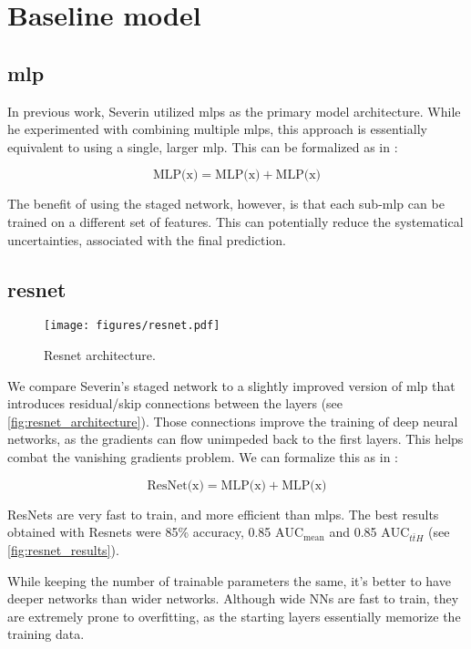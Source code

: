 \section{Baseline model}

\subsection[MLP]{\gls{mlp}}

In previous work, Severin utilized \glspl{mlp} as the primary model architecture.
While he experimented with combining multiple \glspl{mlp}, this approach is essentially equivalent to using a single,
larger \gls{mlp}. This can be formalized as in \cite{ft-transformer}:

$$
    \text{MLP(x)} = \text{MLP(x)} + \text{MLP(x)}
$$

The benefit of using the staged network, however, is that each sub-\gls{mlp} can be trained on a different set of
features. This can potentially reduce the systematical uncertainties, associated with the final prediction.



\subsection[resnet]{\gls{resnet}}

\begin{figure}[htbp]
    \centering
    \texttt{[image: figures/resnet.pdf]}
    \caption{Resnet architecture.}
    \label{fig:resnet_architecture}
\end{figure}

We compare Severin's staged network to a slightly improved version of \gls{mlp} that introduces residual/skip
connections between the layers (see \autoref{fig:resnet_architecture}).
Those connections improve the training of deep neural networks, as the gradients can flow unimpeded back to the first
layers. This helps combat the vanishing gradients problem. We can formalize this as in
\cite{ft-transformer}:

$$
    \text{ResNet(x)} = \text{MLP(x)} + \text{MLP(x)}
$$

ResNets are very fast to train, and more efficient than mlps. The best results obtained with Resnets were 85\% accuracy,
0.85 $\text{AUC}_\text{mean}$ and 0.85 $\text{AUC}_{t\bar{t}H}$ (see \autoref{fig:resnet_results}).

While keeping the number of trainable parameters the same, it's better to have deeper networks than wider networks.
Although wide NNs are fast to train, they are extremely prone to overfitting, as the starting layers essentially
memorize the training data.

